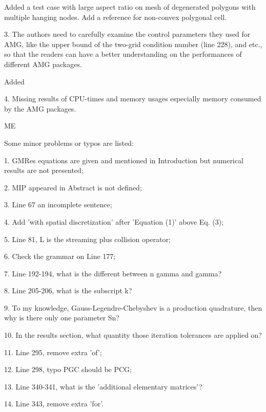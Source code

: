 \documentclass{article}
\begin{document}
Added a test case with large aspect ratio on mesh of degenerated polygons with
multiple hanging nodes. Add a reference for non-convex polygonal cell.

\bigskip


{
\color{blue}
3. The authors need to carefully examine the control parameters they used for AMG, like the upper bound of the two-grid condition number (line 228), and etc., so that the readers can have a better understanding on the performances of different AMG packages.
}

Added

\bigskip


{
\color{blue}
4. Missing results of CPU-times and memory usages especially memory consumed by the AMG packages.
}


ME

\bigskip


{
\color{blue}
\noindent
Some minor problems or typos are listed:

1. GMRes equations are given and mentioned in Introduction but numerical results are not presented;

2. MIP appeared in Abstract is not defined;

3. Line 67 an incomplete sentence;

4. Add 'with spatial discretization' after 'Equation (1)' above Eq. (3);

5. Line 81, L is the streaming plus collision operator;

6. Check the grammar on Line 177;

7. Line 192-194, what is the different between n gamma and gamma?

8. Line 205-206, what is the subscript k?

9. To my knowledge, Gauss-Legendre-Chebyshev is a production quadrature, then why is there only one parameter Sn?

10. In the results section, what quantity those iteration tolerances are applied on?

11. Line 295, remove extra 'of';

12. Line 298, typo PGC should be PCG;

13. Line 340-341, what is the 'additional elementary matrices'?

14. Line 343, remove extra 'for'.}
\end{document}
